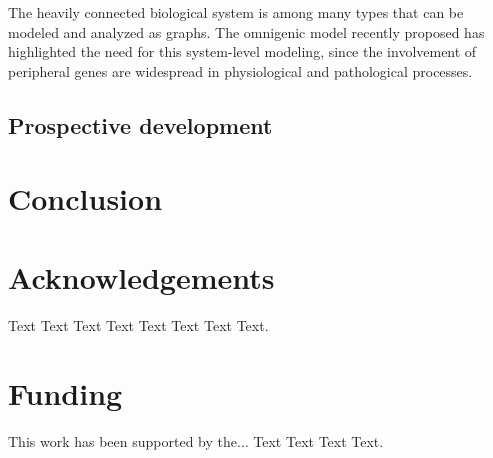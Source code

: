 \documentclass[letter]{bioinfo}
\begin{document}
The heavily connected biological system is among many types that can be modeled and analyzed as graphs. The omnigenic model recently proposed has highlighted the need for this system-level modeling, since the involvement of peripheral genes are widespread in physiological and pathological processes.

\subsection{Prospective development}



\section{Conclusion}


%

\enlargethispage{12pt}




\section*{Acknowledgements}

Text Text Text Text Text Text  Text Text.  
\vspace*{-12pt}

\section*{Funding}

This work has been supported by the... Text Text  Text Text.\vspace*{-12pt}


%
%
%
%
%
%

\end{document}
